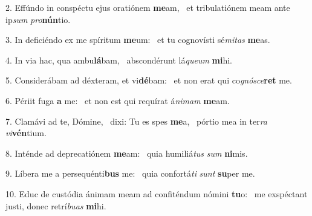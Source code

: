 2. Effúndo in conspéctu ejus oratiónem \textbf{me}am, \ast\  et tribulatiónem meam ante ip\textit{sum} \textit{pro}\textbf{nún}tio.\

3. In deficiéndo ex me spíritum \textbf{me}um: \ast\  et tu cognovísti sé\textit{mi}\textit{tas} \textbf{me}as.\

4. In via hac, qua ambu\textbf{lá}bam, \ast\  abscondérunt lá\textit{que}\textit{um} \textbf{mi}hi.\

5. Considerábam ad déxteram, et vi\textbf{dé}bam: \ast\  et non erat qui co\textit{gnó}\textit{sce}\textbf{ret} me.\

6. Périit fuga \textbf{a} me: \ast\  et non est qui requírat á\textit{ni}\textit{mam} \textbf{me}am.\

7. Clamávi ad te, Dómine, \dag\  dixi: Tu es spes \textbf{me}a, \ast\  pórtio mea in ter\textit{ra} \textit{vi}\textbf{vén}tium.\

8. Inténde ad deprecatiónem \textbf{me}am: \ast\  quia humiliá\textit{tus} \textit{sum} \textbf{ni}mis.\

9. Líbera me a persequénti\textbf{bus} me: \ast\  quia confortá\textit{ti} \textit{sunt} \textbf{su}per me.\

10. Educ de custódia ánimam meam ad confiténdum nómini \textbf{tu}o: \ast\  me exspéctant justi, donec retrí\textit{bu}\textit{as} \textbf{mi}hi.\

